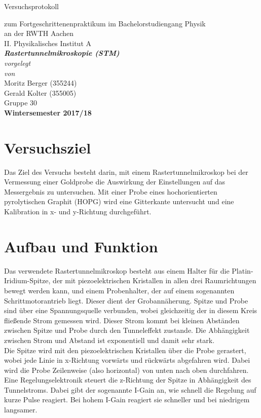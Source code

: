 \documentclass[12pt,a4paper]{article}
\author{Gerald}
\begin{document}
	\setlength{\parindent}{0pt} 
	\begin{center}
		{\LARGE Versuchsprotokoll}\\
		\begin{large}
			zum Fortgeschrittenenpraktikum im Bachelorstudiengang Physik\\[0.4cm]
			an der RWTH Aachen\\
			II. Physikalisches Institut A\\[5.5cm]
			\Large\textbf{\textsl{Rastertunnelmikroskopie (STM)}}\\[5.5cm]
			\normalsize\textit{vorgelegt\\von}\\[0.4cm]
			\large{Moritz Berger (355244)\\Gerald Kolter (355005)}\\Gruppe 30\\[2cm]
			\large \textbf{Wintersemester 2017/18}
		\end{large}
	\end{center}
	\newpage
	
	\tableofcontents
	\newpage

\section{Versuchsziel}
Das Ziel des Versuchs besteht darin, mit einem Rastertunnelmikroskop bei der Vermessung einer Goldprobe die Auswirkung der Einstellungen auf das Messergebnis zu untersuchen. Mit einer Probe eines hochorientierten pyrolytischen Graphit (HOPG) wird eine Gitterkante untersucht und eine Kalibration in x- und y-Richtung durchgeführt.

\section{Aufbau und Funktion}
Das verwendete Rastertunnelmikroskop besteht aus einem Halter für die Platin-Iridium-Spitze, der mit piezoelektrischen Kristallen in allen drei Raumrichtungen bewegt werden kann, und einem Probenhalter, der auf einem sogenannten Schrittmotorantrieb liegt. Dieser dient der Grobannäherung. Spitze und Probe sind über eine Spannungsquelle verbunden, wobei gleichzeitig der in diesem Kreis fließende Strom gemessen wird. Dieser Strom kommt bei kleinen Abständen zwischen Spitze und Probe durch den Tunneleffekt zustande. Die Abhängigkeit zwischen Strom und Abstand ist exponentiell und damit sehr stark.\\
Die Spitze wird mit den piezoelektrischen Kristallen über die Probe gerastert, wobei jede Linie in x-Richtung vorwärts und rückwärts abgefahren wird. Dabei wird die Probe Zeilenweise (also horizontal) von unten nach oben durchfahren.
Eine Regelungselektronik steuert die z-Richtung der Spitze in Abhängigkeit des Tunnelstroms. Dabei gibt der sogenannte I-Gain an, wie schnell die Regelung auf kurze Pulse reagiert. Bei hohem I-Gain reagiert sie schneller und bei niedrigem langsamer.
\end{document}
